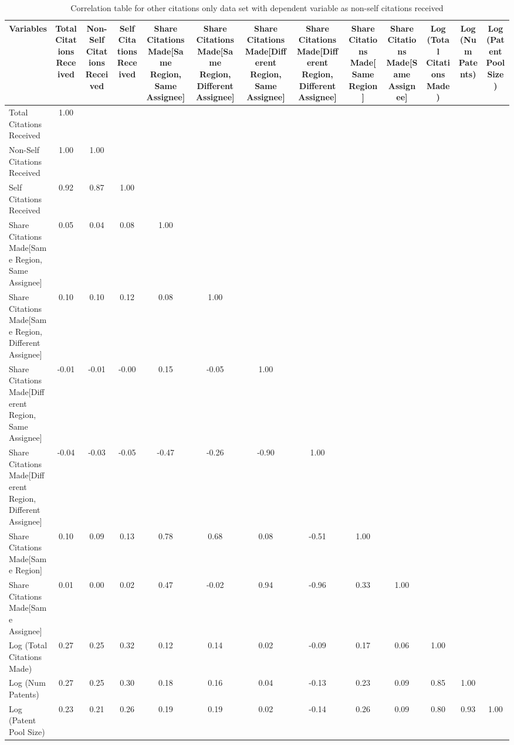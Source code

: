 \begin{table}[htbp]\centering \caption{Correlation table for other citations only data set with dependent variable as non-self citations received \label{o.ncorrelation}}
\begin{tabular}{l  c  c  c  c  c  c  c  c  c  c  c  c }\hline\hline
\multicolumn{1}{c}{Variables} &Total Citations Received&Non-Self Citations Received&Self Citations Received&Share Citations Made[Same Region, Same Assignee]&Share Citations Made[Same Region, Different Assignee]&Share Citations Made[Different Region, Same Assignee]&Share Citations Made[Different Region, Different Assignee]&Share Citations Made[Same Region]&Share Citations Made[Same Assignee]&Log (Total Citations Made)&Log (Num Patents)&Log (Patent Pool Size)\\ \hline
Total Citations Received&1.00\\
Non-Self Citations Received&1.00&1.00\\
Self Citations Received&0.92&0.87&1.00\\
Share Citations Made[Same Region, Same Assignee]&0.05&0.04&0.08&1.00\\
Share Citations Made[Same Region, Different Assignee]&0.10&0.10&0.12&0.08&1.00\\
Share Citations Made[Different Region, Same Assignee]&-0.01&-0.01&-0.00&0.15&-0.05&1.00\\
Share Citations Made[Different Region, Different Assignee]&-0.04&-0.03&-0.05&-0.47&-0.26&-0.90&1.00\\
Share Citations Made[Same Region]&0.10&0.09&0.13&0.78&0.68&0.08&-0.51&1.00\\
Share Citations Made[Same Assignee]&0.01&0.00&0.02&0.47&-0.02&0.94&-0.96&0.33&1.00\\
Log (Total Citations Made)&0.27&0.25&0.32&0.12&0.14&0.02&-0.09&0.17&0.06&1.00\\
Log (Num Patents)&0.27&0.25&0.30&0.18&0.16&0.04&-0.13&0.23&0.09&0.85&1.00\\
Log (Patent Pool Size)&0.23&0.21&0.26&0.19&0.19&0.02&-0.14&0.26&0.09&0.80&0.93&1.00\\
\hline \hline 
 \end{tabular}
\end{table}
